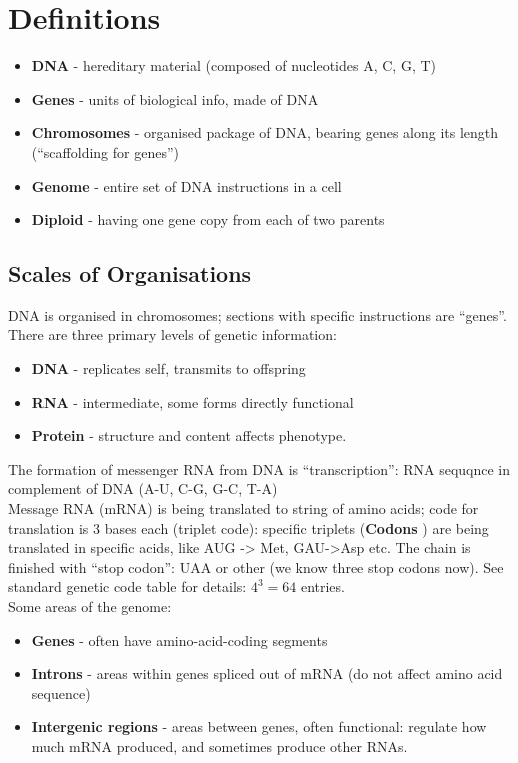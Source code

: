 \documentclass{scrartcl}
\begin{document}
\section {Definitions}
\label{sec:2-1}
\begin{itemize}
\item {\bf DNA } - hereditary material (composed of nucleotides A, C, G, T)
\item {\bf Genes } - units of biological info, made of DNA
\item {\bf Chromosomes } - organised package of DNA, bearing genes along its
  length (``scaffolding for genes'')
\item {\bf Genome } - entire set of DNA instructions in a cell
\item {\bf Diploid } - having one gene copy from each of two parents
\end{itemize}
\subsection{Scales of Organisations}
\label{sec:2-3}
DNA is organised in chromosomes; sections with specific instructions are
``genes''. There are three primary levels of genetic information:
\begin{itemize}
\item {\bf DNA } - replicates self, transmits to offspring
\item {\bf RNA } - intermediate, some forms directly functional
\item {\bf Protein } - structure and content affects phenotype.
\end{itemize}
The formation of messenger RNA from DNA is ``transcription'': RNA sequqnce in
complement of DNA (A-U, C-G, G-C, T-A)\\
Message RNA (mRNA) is being translated to string of amino acids; code for
translation is 3 bases each (triplet code): specific triplets ({\bf Codons })
are being translated in specific acids, like AUG -> Met, GAU->Asp etc. The chain
is finished with ``stop codon'': UAA or other (we know three stop codons now).
See standard genetic code table for details: $4^3 = 64$ entries.\\
Some areas of the genome:
\begin{itemize}
\item {\bf Genes } - often have amino-acid-coding segments
\item {\bf Introns } - areas within genes spliced out of mRNA (do not affect
  amino acid sequence)
\item {\bf Intergenic regions } - areas between genes, often functional:
  regulate how much mRNA produced, and sometimes produce other RNAs.
\end{itemize}
\end{document}
